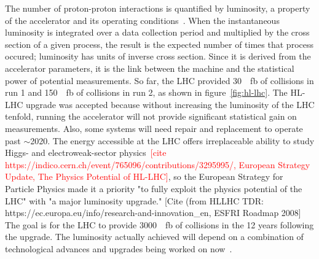 The number of proton-proton interactions is quantified by luminosity, a property of the accelerator and its operating conditions~\cite{zyla_review_2020}. When the instantaneous luminosity is integrated over a data collection period and multiplied by the cross section of a given process, the result is the expected number of times that process occured; luminosity has units of inverse cross section. Since it is derived from the accelerator parameters, it is the link between the machine and the statistical power of potential measurements. 
%
%
%
%
%
%
So far, the LHC provided \SI{30}{\per\femto\barn} of collisions in run 1 and \SI{150}{\per\femto\barn} of collisions in run 2, as shown in figure~\ref{fig:hl-lhc}. The HL-LHC upgrade was accepted because without increasing the luminosity of the LHC tenfold, running the accelerator will not provide significant statistical gain on measurements. Also, some systems will need repair and replacement to operate past $\sim$2020. The energy accessible at the LHC offers irreplaceable ability to study Higgs- and electroweak-sector physics~\textcolor{red}{[cite https://indico.cern.ch/event/765096/contributions/3295995/, European Strategy Update, The Physics Potential of HL-LHC]}, so the European Strategy for Particle Physics made it a priority "to fully exploit the physics potential of the LHC" with "a major luminosity upgrade." [Cite (from HLLHC TDR: https://ec.europa.eu/info/research-and-innovation_en, ESFRI Roadmap 2008] The goal is for the LHC to provide \SI{3000}{\per\femto\barn} of collisions in the 12 years following the upgrade. The luminosity actually achieved will depend on a combination of technological advances and upgrades being worked on now~\cite{hl_lhc_tdr}.


